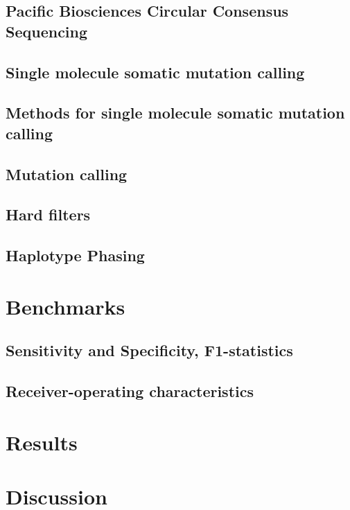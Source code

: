 \subsection{Pacific Biosciences Circular Consensus Sequencing}


\subsection{Single molecule somatic mutation calling}
\subsection{Methods for single molecule somatic mutation calling}
\subsection{Mutation calling}
\subsection{Hard filters}
\subsection{Haplotype Phasing}
\section{Benchmarks}
\subsection{Sensitivity and Specificity, F1-statistics}
\subsection{Receiver-operating characteristics}
\section{Results}
\subsection{}
\subsection{}
\section{Discussion}
